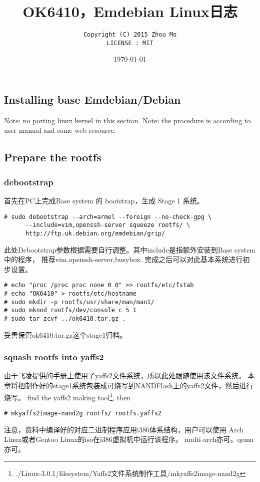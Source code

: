\documentclass[11pt,a4paper]{article}
\title{OK6410，Emdebian Linux日志}
\author{\texttt{Copyright (C) 2015 Zhou Mo}\\\texttt{LICENSE : MIT}}
\date{\today}
\begin{document}
\begin{CJK}{UTF8}{gbsn}
\maketitle
\tableofcontents

\newpage
\section{Installing base Emdebian/Debian}
Note: no porting linux kernel in this section.\newline
Note: the procedure is according to user manual and some web resource.
\subsection{Prepare the rootfs}
\subsubsection{debootstrap}
首先在PC上完成Base system 的 bootstrap，生成 Stage 1 系统。
\begin{verbatim}
# sudo debootstrap --arch=armel --foreign --no-check-gpg \
	  --include=vim,openssh-server squeeze rootfs/ \
	  http://ftp.uk.debian.org/emdebian/grip/
\end{verbatim}
	此处Debootstrap参数根据需要自行调整。其中include是指额外安装到Base system中的程序，
	推荐vim,openssh-server,busybox.\newline
	完成之后可以对此基本系统进行初步设置。
\begin{verbatim}
# echo "proc /proc proc none 0 0" >> rootfs/etc/fstab
# echo "OK6410" > rootfs/etc/hostname
# sudo mkdir -p rootfs/usr/share/man/man1/
# sudo mknod rootfs/dev/console c 5 1
# sudo tar zcvf ../ok6410.tar.gz .
\end{verbatim}
妥善保管ok6410.tar.gz这个stage1归档。

\subsubsection{squash rootfs into yaffs2}
由于飞凌提供的手册上使用了yaffs2文件系统，所以此处跟随使用该文件系统。\newline
本章将把制作好的stage1系统包装成可烧写到NANDFlash上的yaffs2文件，然后进行烧写。\newline
find the yaffs2 making tool\footnote{./Linux-3.0.1/filesystem/Yaffs2文件系统制作工具/mkyaffs2image-nand2g}, then
\begin{verbatim}
# mkyaffs2image-nand2g rootfs/ rootfs.yaffs2
\end{verbatim}
	注意，资料中编译好的对应二进制程序应用i386体系结构，用户可以使用
	Arch Linux或者Gentoo Linux的iso在i386虚拟机中运行该程序。
	multi-arch亦可。qemu亦可。


\end{CJK}
\end{document}
